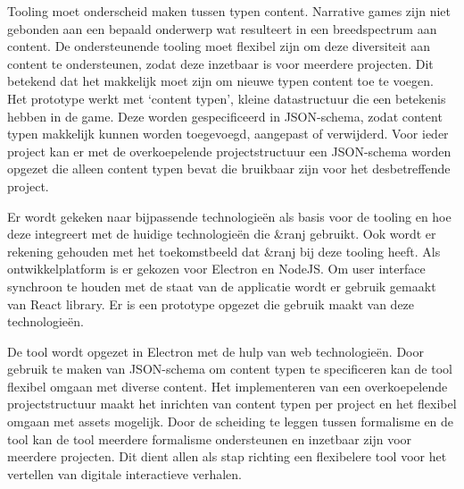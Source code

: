 Tooling moet onderscheid maken tussen typen content. Narrative games zijn niet gebonden aan een bepaald onderwerp wat resulteert in een breedspectrum aan content. De ondersteunende tooling moet flexibel zijn om deze diversiteit aan content te ondersteunen, zodat deze inzetbaar is voor meerdere projecten. Dit betekend dat het makkelijk moet zijn om nieuwe typen content toe te voegen. Het prototype werkt met ‘content typen’, kleine datastructuur die een betekenis hebben in de game. Deze worden gespecificeerd in JSON-schema, zodat content typen makkelijk kunnen worden toegevoegd, aangepast of verwijderd. Voor ieder project kan er met de overkoepelende projectstructuur een JSON-schema worden opgezet die alleen content typen bevat die bruikbaar zijn voor het desbetreffende project.

Er wordt gekeken naar bijpassende technologieën als basis voor de tooling en hoe deze integreert met de huidige technologieën die \&ranj gebruikt. Ook wordt er rekening gehouden met het toekomstbeeld dat \&ranj bij deze tooling heeft. Als ontwikkelplatform is er gekozen voor Electron en NodeJS. Om user interface synchroon te houden met de staat van de applicatie wordt er gebruik gemaakt van React library. Er is een prototype opgezet die gebruik maakt van deze technologieën.

De tool wordt opgezet in Electron met de hulp van web technologieën. Door gebruik te maken van JSON-schema om content typen te specificeren kan de tool flexibel omgaan met diverse content. Het implementeren van een overkoepelende projectstructuur maakt het inrichten van content typen per project en het flexibel omgaan met assets mogelijk. Door de scheiding te leggen tussen formalisme en de tool kan de tool meerdere formalisme ondersteunen en inzetbaar zijn voor meerdere projecten. Dit dient allen als stap richting een flexibelere tool voor het vertellen van digitale interactieve verhalen.
